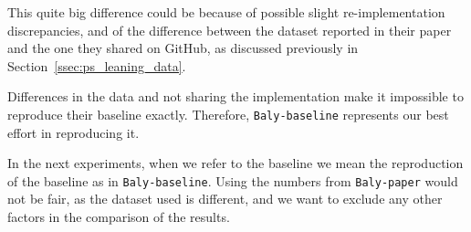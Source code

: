 This quite big difference could be because of possible slight re-implementation discrepancies, and of the difference between the dataset reported in their paper and the one they shared on GitHub, as discussed previously in Section~\ref{ssec:ps_leaning_data}.%

Differences in the data and not sharing the implementation make it impossible to reproduce their baseline exactly.
Therefore, \texttt{Baly-baseline} represents our best effort in reproducing it.

In the next experiments, when we refer to the baseline
we mean the reproduction of the baseline as in \texttt{Baly-baseline}. Using the numbers from \texttt{Baly-paper} would not be fair, as the dataset used is different, and we want to exclude any other factors in the comparison of the results.











